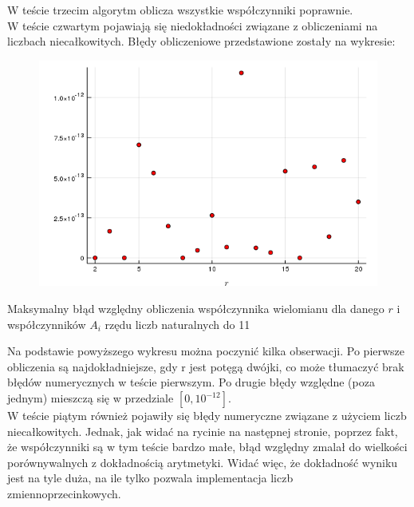 \documentclass[a4paper]{article}
\begin{document}
W teście trzecim algorytm oblicza wszystkie współczynniki poprawnie.\\

W teście czwartym pojawiają się niedokładności związane z obliczeniami na liczbach niecałkowitych. Błędy obliczeniowe przedstawione zostały na wykresie:\\

\begin{figure}[h!]
  \includegraphics[width=14cm]{error_Czebyszew_to_binomial.png}
\end{figure}
\begin{center}
Maksymalny błąd względny obliczenia współczynnika wielomianu dla danego $r$ i współczynników $A_i$ rzędu liczb naturalnych do 11
\end{center}
Na podstawie powyższego wykresu można poczynić kilka obserwacji. Po pierwsze obliczenia są najdokładniejsze, gdy r jest potęgą dwójki, co może tłumaczyć brak błędów numerycznych w teście pierwszym. Po drugie błędy względne (poza jednym) mieszczą się w przedziale $\left[0, 10^{-12} \right]$.\\

W teście piątym również pojawiły się błędy numeryczne związane z użyciem liczb niecałkowitych. Jednak, jak widać na rycinie na następnej stronie, poprzez fakt, że współczynniki są w tym teście bardzo małe, błąd względny zmalał do wielkości porównywalnych z dokładnością arytmetyki. Widać więc, że dokładność wyniku jest na tyle duża, na ile tylko pozwala implementacja liczb zmiennoprzecinkowych.
\end{document}
